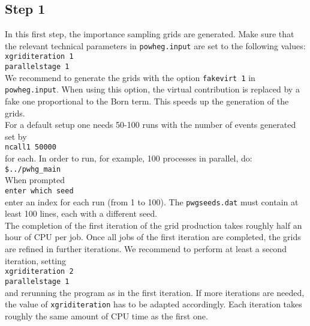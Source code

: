 \documentclass[a4paper,11pt]{article}
\begin{document}
\subsection*{Step 1}
%
In this first step, the importance sampling grids are generated. Make sure that the relevant technical parameters in {\tt powheg.input} are set to the following values:
\\[2ex]
{\tt xgriditeration   1}
\\
{\tt parallelstage     1}
\\[2ex]
We recommend to generate the grids with the option {\tt fakevirt 1} in
{\tt powheg.input}. When using this option, the virtual contribution
is replaced by a fake one proportional to the Born term. This speeds
up the generation of the grids.
\\[2ex]
For a default setup one needs 50-100 runs with the number of events generated set by
\\[2ex] 
{\tt ncall1 50000}
\\[2ex] 
for each. 
In order to run, for example, 100 processes in parallel, do: 
\\[2ex]
{\tt \$../pwhg\_main}
\\[2ex]
When prompted
\\[2ex]
{\tt enter which seed}
\\[2ex]
enter an index for each run (from 1 to 100). The {\tt pwgseeds.dat}
must contain at least 100 lines, each with a different seed.
\\[2ex]
The completion of the first iteration of the grid production takes
roughly half an hour of CPU per job. Once all jobs of the first iteration are completed,  the grids are refined in further iterations. We recommend to perform at least a second iteration, setting 
\\[2ex]
{\tt xgriditeration   2}
\\
{\tt parallelstage     1}
\\[2ex]
%
and rerunning the program as in the first iteration. If more iterations are needed, the value of {\tt xgriditeration} has to be adapted accordingly.  Each iteration takes roughly the same amount of CPU time as the first one. 
 

\end{document}
